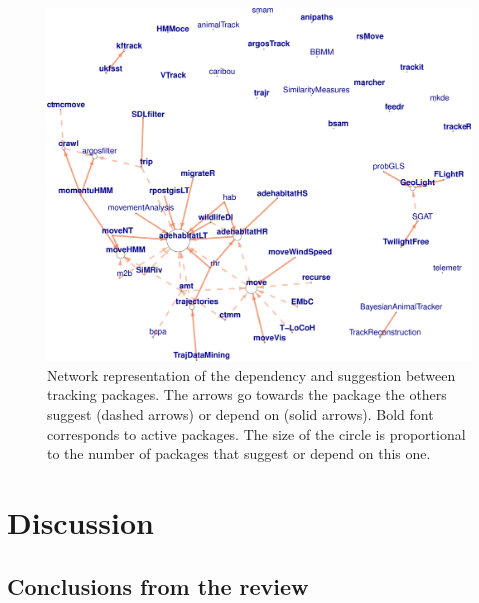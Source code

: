 \documentclass[a4paper,12pt]{article}
\begin{document}
{\begin{figure}
        \centering
        \includegraphics[width=1\textwidth]{./mes_images/NetworkImportSuggestTrack2.pdf}
        \caption{\label{fig:NetImpSuggMov} Network representation of the dependency and suggestion between tracking packages. The arrows go towards the package the others suggest (dashed arrows) or depend on (solid arrows). Bold font corresponds to active packages. The size of the circle is proportional to the number of packages that suggest or depend on this one.} %
\end{figure}

\section*{Discussion}
%
%
\subsection*{Conclusions from the review}

}
\end{document}
